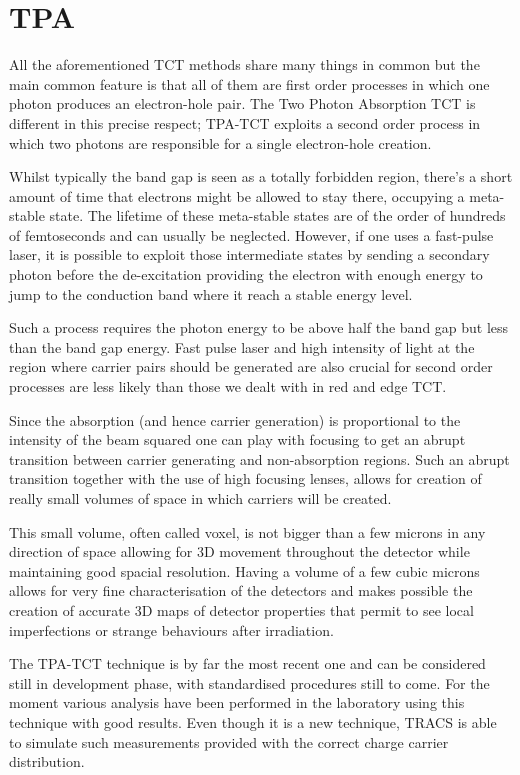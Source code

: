 \section{TPA} %

All the aforementioned TCT methods share many things in common but the main common feature is that all of them are first order processes in which one photon produces an electron-hole pair. The Two Photon Absorption TCT is different in this precise respect; TPA-TCT exploits a second order process in which two photons are responsible for a single electron-hole creation.

Whilst typically the band gap is seen as a totally forbidden region, there's a short amount of time that electrons might be allowed to stay there, occupying a meta-stable state. The lifetime of these meta-stable states are of the order of hundreds of femtoseconds and can usually be neglected. However, if one uses a fast-pulse laser, it is possible to exploit those intermediate states by sending a secondary photon before the de-excitation providing the electron with enough energy to jump to the conduction band where it reach a stable energy level.

Such a process requires the photon energy to be above half the band gap but less than the band gap energy. Fast pulse laser and high intensity of light at the region where carrier pairs should be generated are also crucial for second order processes are less likely than those we dealt with in red and edge TCT.

Since the absorption (and hence carrier generation) is proportional to the intensity of the beam squared one can play with focusing to get an abrupt transition between carrier generating and non-absorption regions. Such an abrupt transition together with the use of high focusing lenses, allows for creation of really small volumes of space in which carriers will be created. 

 This small volume, often called voxel, is not bigger than a few microns in any direction of space allowing for 3D movement throughout the detector while maintaining good spacial resolution. Having a volume of a few cubic microns allows for very fine characterisation of the detectors and makes possible the creation of accurate 3D maps of detector properties that permit to see local imperfections or strange behaviours after irradiation.

 The TPA-TCT technique is by far the most recent one and can be considered still in development phase, with standardised procedures still to come. For the moment various analysis have been performed in the laboratory using this technique with good results. Even though it is a new technique, TRACS is able to simulate such measurements provided with the correct charge carrier distribution.
